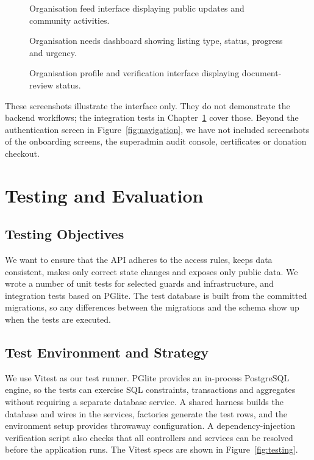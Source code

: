 \begin{figure}[H]
\centering
{}
\caption{Organisation feed interface displaying public updates and community activities.}
\label{fig:organisation-feed}
\end{figure}

\begin{figure}[H]
\centering
{}
\caption{Organisation needs dashboard showing listing type, status, progress and urgency.}
\label{fig:needs-management}
\end{figure}

\begin{figure}[H]
\centering
{}
\caption{Organisation profile and verification interface displaying document-review status.}
\label{fig:org-verification}
\end{figure}

\noindent These screenshots illustrate the interface only. They do not demonstrate the backend workflows; the integration tests in Chapter~\ref{ch:testing} cover those. Beyond the authentication screen in Figure~\ref{fig:navigation}, we have not included screenshots of the onboarding screens, the superadmin audit console, certificates or donation checkout.

\chapter{Testing and Evaluation}
\label{ch:testing}

\section{Testing Objectives}
\label{sec:testing-objectives}
We want to ensure that the API adheres to the access rules, keeps data consistent, makes only correct state changes and exposes only public data. We wrote a number of unit tests for selected guards and infrastructure, and integration tests based on PGlite. The test database is built from the committed migrations, so any differences between the migrations and the schema show up when the tests are executed.

\section{Test Environment and Strategy}
We use Vitest as our test runner. PGlite provides an in-process PostgreSQL engine, so the tests can exercise SQL constraints, transactions and aggregates without requiring a separate database service. A shared harness builds the database and wires in the services, factories generate the test rows, and the environment setup provides throwaway configuration. A dependency-injection verification script also checks that all controllers and services can be resolved before the application runs. The Vitest specs are shown in Figure~\ref{fig:testing}.

